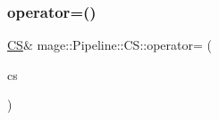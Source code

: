 \subsubsection{\texorpdfstring{operator=()}{operator=()}\hspace{0.1cm}{\footnotesize\ttfamily [2/2]}}
{\footnotesize\ttfamily \hyperlink{structmage_1_1_pipeline_1_1_c_s}{CS}\& mage\+::\+Pipeline\+::\+C\+S\+::operator= (\begin{DoxyParamCaption}\item[{\hyperlink{structmage_1_1_pipeline_1_1_c_s}{CS} \&\&}]{cs }\end{DoxyParamCaption})\hspace{0.3cm}{\ttfamily [delete]}}

